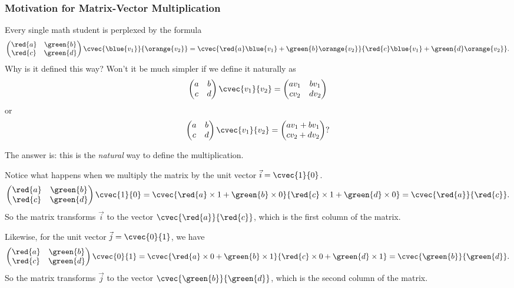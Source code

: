 \begin{frame}
\frametitle{Motivation for Matrix-Vector Multiplication}
Every single math student is perplexed by the formula
\[ \begin{pmatrix} \red{a} & \green{b} \\ \red{c} & \green{d} \end{pmatrix}\cvec{\blue{v_1}}{\orange{v_2}}  = \cvec{\red{a}\blue{v_1} + \green{b}\orange{v_2}}{\red{c}\blue{v_1} +\green{d}\orange{v_2}}.\]
Why is it defined this way? Won't it be much simpler if we define it naturally as
\[ \begin{pmatrix} a & b \\ c & d \end{pmatrix}\cvec{v_1}{v_2} = \begin{pmatrix} av_1 & bv_1 \\ cv_2 & dv_2 \end{pmatrix}\]
or 
\[ \begin{pmatrix} a & b \\ c & d \end{pmatrix}\cvec{v_1}{v_2} =  \begin{pmatrix} av_1 + bv_1 \\ cv_2 + dv_2 \end{pmatrix}?\]
\end{frame}

\begin{frame}
The answer is: this is the \textit{natural} way to define the multiplication. 

Notice what happens when we multiply the matrix by the unit vector $\vec{i} = \cvec{1}{0}$.
\[ \begin{pmatrix} \red{a} & \green{b} \\ \red{c} & \green{d} \end{pmatrix}\cvec{1}{0}  = \cvec{\red{a}\times 1 + \green{b} \times 0}{\red{c} \times 1 +\green{d} \times 0} = \cvec{\red{a}}{\red{c}}.\]
So the matrix transforms $\vec{i}$ to the vector $\cvec{\red{a}}{\red{c}}$, which is the first column of the matrix. 
\end{frame}

\begin{frame}
Likewise, for the unit vector $\vec{j} = \cvec{0}{1}$, we have
\[ \begin{pmatrix} \red{a} & \green{b} \\ \red{c} & \green{d} \end{pmatrix}\cvec{0}{1}  = \cvec{\red{a}\times 0 + \green{b} \times 1}{\red{c} \times 0 +\green{d} \times 1} = \cvec{\green{b}}{\green{d}}.\]
So the matrix transforms $\vec{j}$ to the vector $\cvec{\green{b}}{\green{d}}$, which is the second column of the matrix.
\end{frame}


